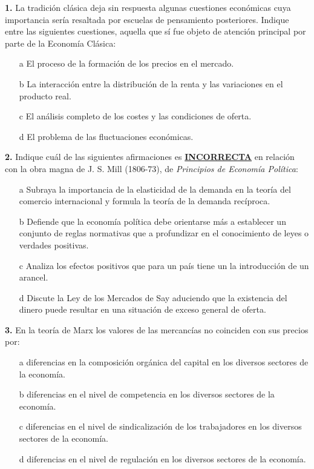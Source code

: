 \documentclass{nuevotema}
\begin{document}
\preguntas

\textbf{1.} La tradición clásica deja sin respuesta algunas cuestiones económicas cuya importancia sería resaltada por escuelas de pensamiento posteriores. Indique entre las siguientes cuestiones, aquella que sí fue objeto de atención principal por parte de la Economía Clásica:

\begin{itemize}
	\item[a] El proceso de la formación de los precios en el mercado.
	\item[b] La interacción entre la distribución de la renta y las variaciones en el producto real.
	\item[c] El análisis completo de los costes y las condiciones de oferta.
	\item[d] El problema de las fluctuaciones económicas.
\end{itemize}


\textbf{2.} Indique cuál de las siguientes afirmaciones es \underline{\textbf{INCORRECTA}} en relación con la obra magna de J. S. Mill (1806-73), de \textit{Principios de Economía Política}:

\begin{itemize}
	\item[a] Subraya la importancia de la elasticidad de la demanda en la teoría del comercio internacional y formula la teoría de la demanda recíproca.
	\item[b] Defiende que la economía política debe orientarse más a establecer un conjunto de reglas normativas que a profundizar en el conocimiento de leyes o verdades positivas.
	\item[c] Analiza los efectos positivos que para un país tiene un la introducción de un arancel.
	\item[d] Discute la Ley de los Mercados de Say aduciendo que la existencia del dinero puede resultar en una situación de exceso general de oferta.
\end{itemize}

\textbf{3.} En la teoría de Marx los valores de las mercancías no coinciden con sus precios por:
\begin{itemize}
	\item[a] diferencias en la composición orgánica del capital en los diversos sectores de la economía.
	\item[b] diferencias en el nivel de competencia en los diversos sectores de la economía.
	\item[c] diferencias en el nivel de sindicalización de los trabajadores en los diversos sectores de la economía.
	\item[d] diferencias en el nivel de regulación en los diversos sectores de la economía.
\end{itemize}
\end{document}
